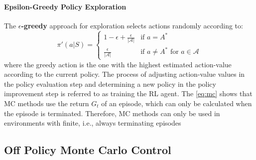 \documentclass[../xlapes02]{subfiles}
\begin{document}
    \paragraph{Epsilon-Greedy Policy Exploration}
    The \textbf{$\epsilon$-greedy} approach for exploration selects actions randomly according to:
    \begin{equation}
        \pi'(a | S) =
        \begin{cases}
            1 - \epsilon + \frac{\epsilon}{|\mathcal{A}|} & \text{if } a = A^* \\
            \frac{\epsilon}{|\mathcal{A}|} & \text{if } a \neq A^* \text{ for } a \in \mathcal{A}
        \end{cases}
    \end{equation}
    where the greedy action is the one with the highest estimated action-value according to the current policy. The process of adjusting action-value values in the policy evaluation step and determining a new policy in the policy improvement step is referred to as training the RL agent. The \cref{eq:mc} shows that MC methods use the return $G_t$ of an episode, which can only be calculated when the episode is terminated. Therefore, MC methods can only be used in environments with finite, i.e., always terminating episodes~\cite{FITMT25127, rao2022foundations, sutton2018reinforcement}

    \subsection{Off Policy Monte Carlo Control}\label{subsec:off-policy-monte-carlo-control}
\end{document}
